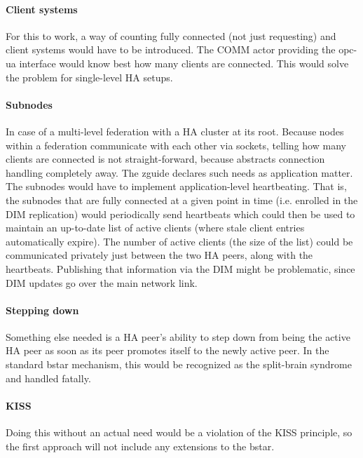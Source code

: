 \paragraph{Client systems}
For this to work, a way of counting fully connected (not just requesting)
and client systems would have to be introduced. The COMM actor providing the \gls{opc-ua}
interface would know best how many clients are connected. This would solve the problem for single-level HA setups.

\paragraph{Subnodes}
In case of a multi-level federation with a HA cluster at its root. Because nodes within a
federation communicate with each other via \zmq sockets, telling how many
clients are connected is not straight-forward, because \zmq abstracts
connection handling completely away. The \gls{zguide} declares such needs as application matter.
The subnodes would have to implement application-level heartbeating.
That is, the subnodes that are fully connected at a given point in time (i.e. enrolled
in the DIM replication) would periodically send heartbeats which could then be
used to maintain an up-to-date list of active clients (where stale client
entries automatically expire).  The number of active clients (the size of the
list) could be communicated privately just between the two HA peers, along with
the heartbeats. Publishing that information via the DIM might be problematic,
since DIM updates go over the main network link.

\paragraph{Stepping down}
Something else needed is a HA peer's ability to step down from being the
active HA peer as soon as its peer promotes itself to the newly active peer. In
the standard \gls{bstar} mechanism, this would be recognized as the split-brain
syndrome and handled fatally.

\paragraph{KISS}
Doing this without an actual need would be a violation of the \gls{KISS} principle,
so the first approach will not include any extensions to the \gls{bstar}.

